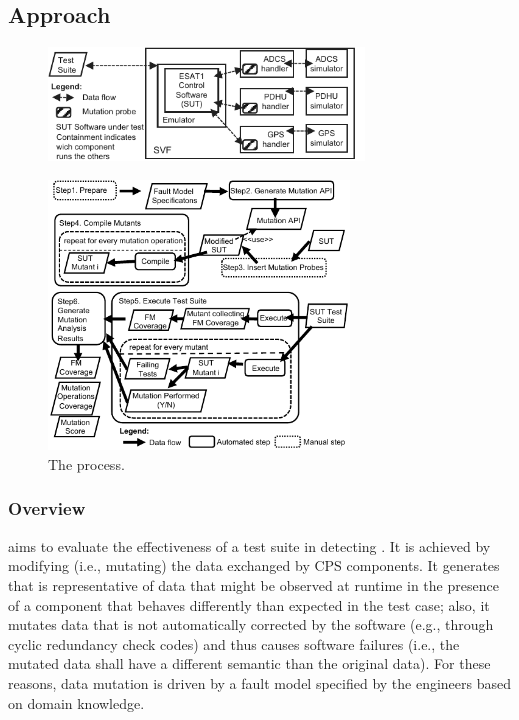 
\subsection{Approach}

\begin{figure}[tb]
	\centering
		\includegraphics[width=8.4cm]{damat/images/dataMutationExample}
		\caption{}
		\label{fig:appr:mutateProbesInserted}
	\end{figure}

\begin{figure}[tb]
	\centering
		\includegraphics[width=8cm]{damat/images/dataDrivenBufferProcess}
		\caption{The \APPR process.}
		\label{fig:appr:approach}
	\end{figure}

\subsubsection{Overview}


 aims to evaluate the effectiveness of a test suite in detecting . 
It is achieved by modifying (i.e., mutating) the data exchanged by CPS components. It generates  that is representative of data that might be observed at runtime in the presence of a component that behaves differently than expected in the test case; also, it mutates  data that is not automatically corrected by the software 
(e.g., through cyclic redundancy check codes)
and thus causes software failures (i.e., the mutated data shall have a different semantic than the original data). For these reasons, data mutation is driven by a fault model specified by the engineers based on domain knowledge.

